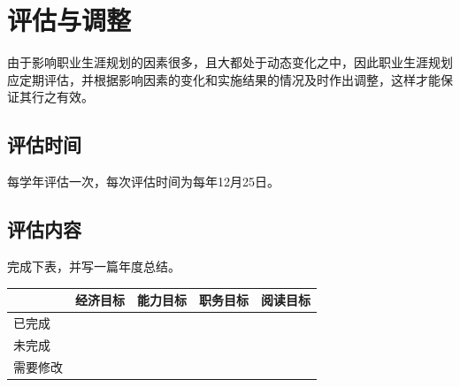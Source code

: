 \documentclass{article}
\begin{document}
\section{评估与调整}
由于影响职业生涯规划的因素很多，且大都处于动态变化之中，因此职业生涯规划应定期评估，并根据影响因素的变化和实施结果的情况及时作出调整，这样才能保证其行之有效。\par 
\subsection{评估时间}
每学年评估一次，每次评估时间为每年12月25日。\par
\subsection{评估内容}
完成下表，并写一篇年度总结。\par
\begin{table}[h]
	\centering
	\begin{tabular}{|l|l|l|l|l|}
		\hline
		& \textbf{经济目标} & \textbf{能力目标} & \textbf{职务目标} & \textbf{阅读目标} \\ \hline
		已完成  &               &               &               &               \\ \hline
		未完成  &               &               &               &               \\ \hline
		需要修改 &               &               &               &               \\ \hline
	\end{tabular}
\end{table}
\end{document}
